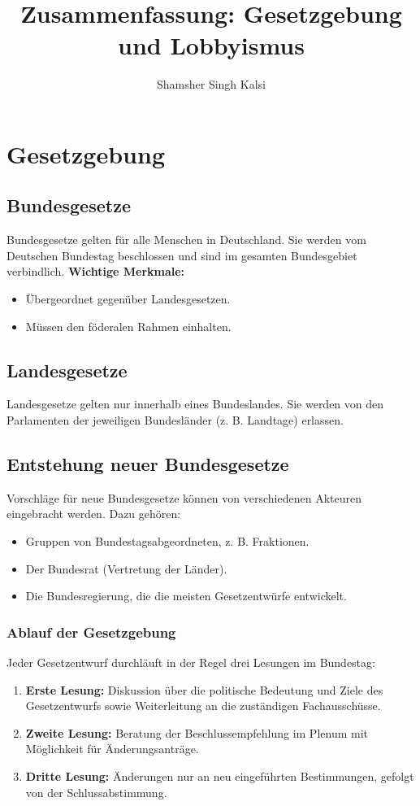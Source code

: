 \documentclass[a4paper,10pt]{article}
\title{Zusammenfassung: Gesetzgebung und Lobbyismus}
\author{Shamsher Singh Kalsi}
\begin{document}
\maketitle

\section{Gesetzgebung}

\subsection{Bundesgesetze}
Bundesgesetze gelten für alle Menschen in Deutschland. Sie werden vom Deutschen Bundestag beschlossen und sind im gesamten Bundesgebiet verbindlich.
\textbf{Wichtige Merkmale:}
\begin{itemize}
    \item Übergeordnet gegenüber Landesgesetzen.
    \item Müssen den föderalen Rahmen einhalten.
\end{itemize}

\subsection{Landesgesetze}
Landesgesetze gelten nur innerhalb eines Bundeslandes. Sie werden von den Parlamenten der jeweiligen Bundesländer (z. B. Landtage) erlassen.

\subsection{Entstehung neuer Bundesgesetze}
Vorschläge für neue Bundesgesetze können von verschiedenen Akteuren eingebracht werden. Dazu gehören:
\begin{itemize}
    \item Gruppen von Bundestagsabgeordneten, z. B. Fraktionen.
    \item Der Bundesrat (Vertretung der Länder).
    \item Die Bundesregierung, die die meisten Gesetzentwürfe entwickelt.
\end{itemize}

\subsubsection{Ablauf der Gesetzgebung}
Jeder Gesetzentwurf durchläuft in der Regel drei Lesungen im Bundestag:
\begin{enumerate}
    \item \textbf{Erste Lesung:} Diskussion über die politische Bedeutung und Ziele des Gesetzentwurfs sowie Weiterleitung an die zuständigen Fachausschüsse.
    \item \textbf{Zweite Lesung:} Beratung der Beschlussempfehlung im Plenum mit Möglichkeit für Änderungsanträge.
    \item \textbf{Dritte Lesung:} Änderungen nur an neu eingeführten Bestimmungen, gefolgt von der Schlussabstimmung.
\end{enumerate}
\end{document}
